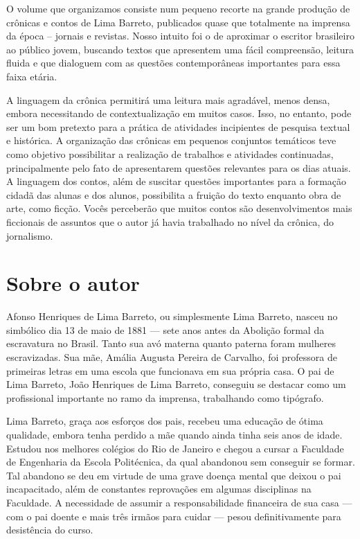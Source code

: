 


O volume que organizamos consiste num pequeno recorte na grande produção de
crônicas e contos de Lima Barreto, publicados quase que totalmente na imprensa
da época – jornais e revistas. Nosso intuito foi o de aproximar o escritor
brasileiro ao público jovem, buscando textos que apresentem uma fácil
compreensão, leitura fluida e que dialoguem com as questões contemporâneas
importantes para essa faixa etária.  

A linguagem da crônica permitirá uma
leitura mais agradável, menos densa, embora necessitando de contextualização em
muitos casos. Isso, no entanto, pode ser um bom pretexto para a prática de
atividades incipientes de pesquisa textual e histórica. A organização das
crônicas em pequenos conjuntos temáticos teve como objetivo possibilitar a
realização de trabalhos e atividades continuadas, principalmente pelo fato de
apresentarem questões relevantes para os dias atuais.  A linguagem dos contos,
além de suscitar questões importantes para a formação cidadã das alunas e dos
alunos, possibilita a fruição do texto enquanto obra de arte, como ficção.
Vocês perceberão que muitos contos são desenvolvimentos mais ficcionais de
assuntos que o autor já havia trabalhado no nível da crônica, do jornalismo.    



\section{Sobre o autor}

Afonso Henriques de Lima Barreto, ou simplesmente Lima Barreto, nasceu
no simbólico dia 13 de maio de 1881 --- sete anos antes da Abolição
formal da escravatura no Brasil. Tanto sua avó materna quanto paterna
foram mulheres escravizadas. Sua mãe, Amália Augusta Pereira de
Carvalho, foi professora de primeiras letras em uma escola que
funcionava em sua própria casa. O pai de Lima Barreto, João Henriques de
Lima Barreto, conseguiu se destacar como um profissional importante no
ramo da imprensa, trabalhando como tipógrafo.

Lima Barreto, graça aos esforços dos pais, recebeu uma educação de ótima
qualidade, embora tenha perdido a mãe quando ainda tinha seis anos de
idade. Estudou nos melhores colégios do Rio de Janeiro e chegou a cursar
a Faculdade de Engenharia da Escola Politécnica, da qual abandonou sem
conseguir se formar. Tal abandono se deu em virtude de uma grave doença
mental que deixou o pai incapacitado, além de constantes reprovações em
algumas disciplinas na Faculdade. A necessidade de assumir a
responsabilidade financeira de sua casa --- com o pai doente e mais três
irmãos para cuidar --- pesou definitivamente para desistência do curso.

